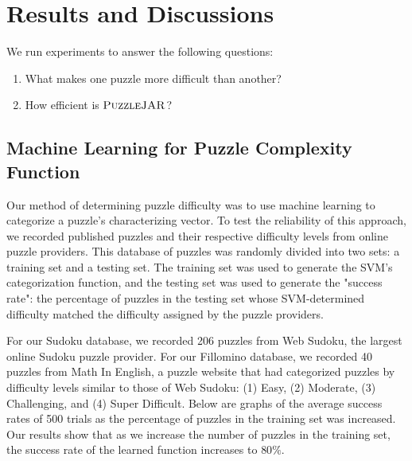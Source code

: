 \section{Results and Discussions}

We run experiments to answer the following questions:
\begin{enumerate}
\item What makes one puzzle more difficult than another?
\item How efficient is $\textsc{PuzzleJAR}$?
\end{enumerate}

\subsection{Machine Learning for Puzzle Complexity Function}

Our method of determining puzzle difficulty was to use machine learning to categorize a puzzle's characterizing vector. To test the reliability of this approach, we recorded published puzzles and their respective difficulty levels from online puzzle providers. This database of puzzles was randomly divided into two sets: a training set and a testing set. The training set was used to generate the SVM's categorization function, and the testing set was used to generate the "success rate": the percentage of puzzles in the testing set whose SVM-determined difficulty matched the difficulty assigned by the puzzle providers. 

For our Sudoku database, we recorded 206 puzzles from Web Sudoku, the
largest online Sudoku puzzle provider. For our Fillomino database, we
recorded 40 puzzles from Math In English, a puzzle website that had
categorized puzzles by difficulty levels similar to those of Web
Sudoku: (1) Easy, (2) Moderate, (3) Challenging, and (4) Super
Difficult. Below are graphs of the average success rates of 500 trials
as the percentage of puzzles in the training set was increased. Our
results show that as we increase the number of puzzles in the
training set, the success rate of the learned function increases to $80 \%$.


